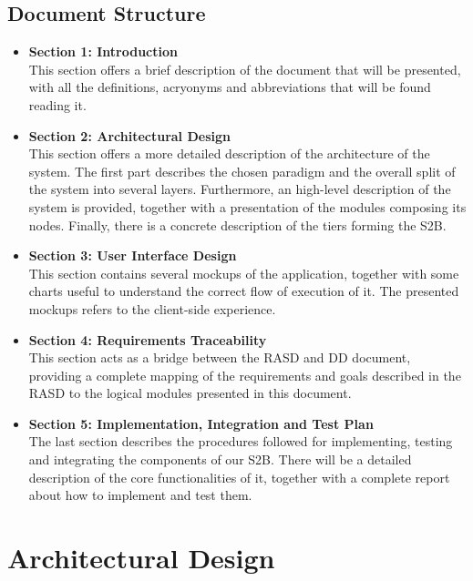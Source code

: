 \documentclass[table, 12pt]{article}
\begin{document}
\subsection{Document Structure}
\begin{itemize}
    \item \textbf{Section 1: Introduction}\\This section offers a brief description of the document that will be presented, with all the definitions, acryonyms and abbreviations that will be found reading it.
    \item \textbf{Section 2: Architectural Design}\\This section offers a more detailed description of the architecture of the system. The first part describes the chosen paradigm and the overall split of the system into several layers. Furthermore, an high-level description of the system is provided, together with a presentation of the modules composing its nodes. Finally, there is a concrete description of the tiers forming the S2B.
    \item \textbf{Section 3: User Interface Design}\\This section contains several mockups of the application, together with some charts useful to understand the correct flow of execution of it. The presented mockups refers to the client-side experience.
    \item \textbf{Section 4: Requirements Traceability}\\This section acts as a bridge between the RASD and DD document, providing a complete mapping of the requirements and goals described in the RASD to the logical modules presented in this document.
    \item \textbf{Section 5: Implementation, Integration and Test Plan}\\The last section describes the procedures followed for implementing, testing and integrating the components of our S2B. There will be a detailed description of the core functionalities of it, together with a complete report about how to implement and test them.
\end{itemize}

\newpage

\section{Architectural Design}
\end{document}
